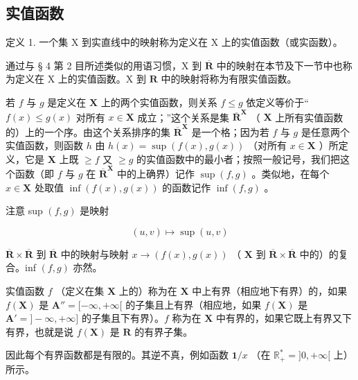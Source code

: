 \subsection{实值函数}

定义 1. 一个集 X 到实直线中的映射称为定义在 X 上的实值函数（或实函数）。

通过与 § 4 第 2 目所述类似的用语习惯，X 到 \(\overline{\mathbf{R}}\) 中的映射在本节及下一节中也称为定义在 X 上的实值函数。X 到 \(\mathbf{R}\) 中的映射将称为有限实值函数。

若 \(f\) 与 \(g\) 是定义在 \(\mathbf{X}\) 上的两个实值函数，则关系 \(f \leqslant g\) 依定义等价于“\(f(x) \leqslant g(x)\) 对所有 \(x \in \mathbf{X}\) 成立；”这个关系是集 \(\overline{\mathbf{R}}^{\mathbf{X}}\) （ \(\mathbf{X}\) 上所有实值函数的）上的一个序。由这个关系排序的集 \(\overline{\mathbf{R}}^{\mathbf{X}}\) 是一个格；因为若 \(f\) 与 \(g\) 是任意两个实值函数，则函数 \(h\) 由 \(h(x) = \sup (f(x), g(x))\) （对所有 \(x \in \mathbf{X}\) ）所定义，它是 \(\mathbf{X}\) 上既 \(\geqslant f\) 又 \(\geqslant g\) 的实值函数中的最小者；按照一般记号，我们把这个函数（即 \(f\) 与 \(g\) 在 \(\overline{\mathbf{R}}^{\mathbf{X}}\) 中的上确界）记作 \(\sup (f, g)\) 。类似地，在每个 \(x \in \mathbf{X}\) 处取值 \(\inf (f(x), g(x))\) 的函数记作 \(\inf (f, g)\) 。

注意 sup \((f, g)\) 是映射

\[
(u, v) \mapsto \sup (u, v)
\]

\(\overline{\mathbf{R}}\times \overline{\mathbf{R}}\) 到 \(\overline{\mathbf{R}}\) 中的映射与映射 \(x\to (f(x),g(x))\) （ \(\mathbf{X}\) 到 \(\overline{\mathbf{R}}\times \overline{\mathbf{R}}\) 中的）的复合。inf \((f,g)\) 亦然。

实值函数 \(f\) （定义在集 \(\mathbf{X}\) 上的）称为在 \(\mathbf{X}\) 中上有界（相应地下有界）的，如果 \(f(\mathbf{X})\) 是 \(\mathbf{A}'' = [-\infty, +\infty[\) 的子集且上有界（相应地，如果 \(f(\mathbf{X})\) 是 \(\mathbf{A}' = ] - \infty, +\infty]\) 的子集且下有界）。\(f\) 称为在 \(\mathbf{X}\) 中有界的，如果它既上有界又下有界，也就是说 \(f(\mathbf{X})\) 是 \(\mathbf{R}\) 的有界子集。

因此每个有界函数都是有限的。其逆不真，例如函数 \(\mathbf{1} / x\) （在 \(\mathbb{R}_+^* = ]0, +\infty[\) 上）所示。
\relax{}
